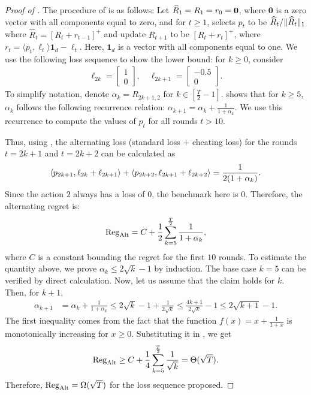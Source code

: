 \begin{proof}[Proof of ]
The procedure of \PRM is as follows: Let $\widehat{R}_1 = {R}_1 = {r}_{0} = \bm{0}$, where $\bm{0}$ is a zero vector with all components equal to zero,
and for $t\ge 1$, \PRM selects $p_t$ to be $\widehat{{R}}_t/\lVert\widehat{{R}}_t\rVert_1$ where $\hat{{R}}_t = [{R}_t+{r}_{t-1}]^+$ and update ${R}_{t+1}$ to be $[{R}_t+{r}_t]^+$, where ${r}_t = \langle {p}_t, {\ell}_t\rangle \bm{1}_d - {\ell}_t$.
Here, $\bm{1}_d$ is a vector with all components equal to one.
We use the following loss sequence to show the lower bound: for $k\ge 0$, consider
    \begin{align*}
    {\ell}_{2k}=
    \begin{bmatrix}
        1\\
        0
    \end{bmatrix},\quad
    {\ell}_{2k+1}=
    \begin{bmatrix}
        -0.5\\
        0
    \end{bmatrix}.
\end{align*}
To simplify notation, denote $\alpha_k=R_{2k+1,2}$ for $k\in [\frac{T}{2}-1]$.  shows that for $k\ge 5$, $\alpha_k$ follows the following recurrence relation: $\alpha_{k+1}=\alpha_k+\frac{1}{1+\alpha_k}$. We use this recurrence to compute the values of $p_t$ for all rounds $t>10$.


Thus, using , the alternating loss (standard loss + cheating loss) for the rounds $t=2k+1$ and $t=2k+2$ can be calculated as
\begin{align*}
    \left\langle {{p}_{2k+1},\ell_{2k}+\ell_{2k+1}} \right\rangle+\left\langle {{p}_{2k+2},\ell_{2k+1}+\ell_{2k+2}} \right\rangle= \frac{1}{2(1+\alpha_k)}.
\end{align*}
Since the action $2$ always has a loss of 0, the benchmark here is 0.
Therefore, the alternating regret is:
\begin{equation}\label{eqn:prm+-regalt}
    \mathrm{Reg}_{\mathrm{Alt}} = C+\frac{1}{2}\sum_{k=5}^{\frac{T}{2}}\frac{1}{1+\alpha_k},
\end{equation}
where $C$ is a constant bounding the regret for the first $10$ rounds.
To estimate the quantity above, we prove $\alpha_k\le 2\sqrt{k}-1$ by induction. The base case $k=5$ can be verified by direct calculation. Now, let us assume that the claim holds for $k$. Then, for $k+1$, 
\begin{align*}
\alpha_{k+1}&=\alpha_k +\frac{1}{1+\alpha_k}\le 2\sqrt{k}-1+\frac{1}{2\sqrt{k}}\le\frac{4k+1}{2\sqrt{k}}-1\le 2\sqrt{k+1}-1.
\end{align*}
The first inequality comes from the fact that the function $f(x)=x+\frac{1}{1+x}$ is monotonically increasing for $x\ge 0$.
Substituting it in , we get
\begin{align*}
\mathrm{Reg}_{\mathrm{Alt}}\ge C+\frac{1}{4}\sum_{k=5}^{\frac{T}{2}} \frac{1}{\sqrt{k}}=\Theta(\sqrt{T}).
\end{align*}
Therefore, $\mathrm{Reg}_{\mathrm{Alt}} = \Omega(\sqrt{T})$ for the loss sequence proposed.
\end{proof}

